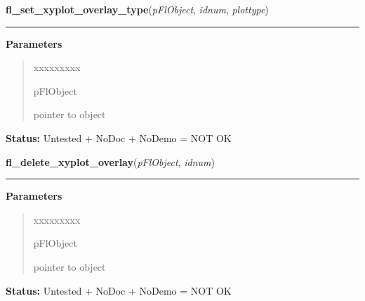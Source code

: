 \hspace{.8\funcindent}\begin{boxedminipage}{\funcwidth}

    \raggedright \textbf{fl\_set\_xyplot\_overlay\_type}(\textit{pFlObject}, \textit{idnum}, \textit{plottype})

    \vspace{-1.5ex}

    \rule{\textwidth}{0.5\fboxrule}
\setlength{\parskip}{2ex}
\setlength{\parskip}{1ex}
      \textbf{Parameters}
      \vspace{-1ex}

      \begin{quote}
        \begin{Ventry}{xxxxxxxxx}

          \item[pFlObject]

          pointer to object

        \end{Ventry}

      \end{quote}

\textbf{Status:} Untested + NoDoc + NoDemo = NOT OK



    \end{boxedminipage}

    \label{xformslib:flxyplot:fl_delete_xyplot_overlay}

    \vspace{0.5ex}

\hspace{.8\funcindent}\begin{boxedminipage}{\funcwidth}

    \raggedright \textbf{fl\_delete\_xyplot\_overlay}(\textit{pFlObject}, \textit{idnum})

    \vspace{-1.5ex}

    \rule{\textwidth}{0.5\fboxrule}
\setlength{\parskip}{2ex}
\setlength{\parskip}{1ex}
      \textbf{Parameters}
      \vspace{-1ex}

      \begin{quote}
        \begin{Ventry}{xxxxxxxxx}

          \item[pFlObject]

          pointer to object

        \end{Ventry}

      \end{quote}

\textbf{Status:} Untested + NoDoc + NoDemo = NOT OK



    \end{boxedminipage}

